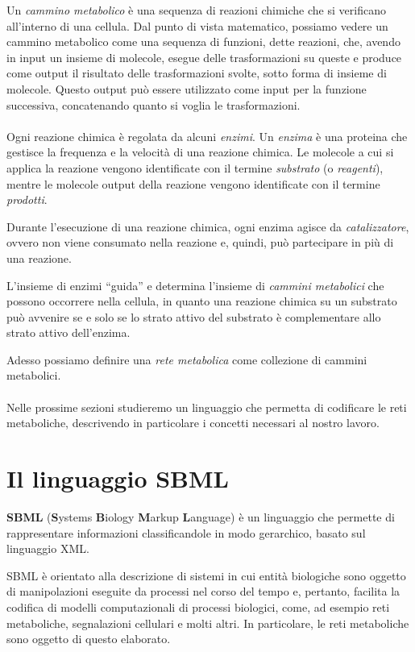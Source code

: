Un \emph{cammino metabolico} \`e una sequenza di reazioni chimiche che
si verificano all'interno di una cellula. Dal punto di vista
matematico, possiamo vedere un cammino metabolico come una sequenza di
funzioni, dette reazioni, che, avendo in input un insieme di molecole,
esegue delle trasformazioni su queste e produce come output il
risultato delle trasformazioni svolte, sotto forma di insieme di
molecole. Questo output pu\`o essere utilizzato come input per la
funzione successiva, concatenando quanto si voglia le trasformazioni.
\\\\
Ogni reazione chimica \`e regolata da alcuni \emph{enzimi}. Un
\emph{enzima} \`e una proteina che gestisce la frequenza e la
velocit\`a di una reazione chimica. Le molecole a cui si applica la
reazione vengono identificate con il termine \emph{substrato} (o
\emph{reagenti}), mentre le molecole output della reazione vengono
identificate con il termine \emph{prodotti}.

Durante l'esecuzione di una reazione chimica, ogni enzima
agisce da \emph{catalizzatore}, ovvero non viene consumato nella reazione
e, quindi, pu\`o partecipare in pi\`u di una reazione.

L'insieme di enzimi ``guida'' e determina l'insieme di \emph{cammini
  metabolici} che possono occorrere nella cellula, in quanto una
reazione chimica su un substrato pu\`o avvenire se e solo se lo strato
attivo del substrato \`e complementare allo strato attivo dell'enzima.

Adesso possiamo definire una \emph{rete metabolica} come collezione di
cammini metabolici.
\\\\
Nelle prossime sezioni studieremo un linguaggio che permetta di
codificare le reti metaboliche, descrivendo in particolare i concetti
necessari al nostro lavoro.

\section{Il linguaggio SBML}
\textbf{SBML} (\textbf{S}ystems \textbf{B}iology \textbf{M}arkup
\textbf{L}anguage) \`e un linguaggio che permette di rappresentare
informazioni classificandole in modo gerarchico, basato sul linguaggio
XML.

SBML \`e orientato alla descrizione di sistemi in cui entit\`a
biologiche sono oggetto di manipolazioni eseguite da processi nel
corso del tempo e, pertanto, facilita la codifica di modelli
computazionali di processi biologici, come, ad esempio reti
metaboliche, segnalazioni cellulari e molti altri. In particolare, le
reti metaboliche sono oggetto di questo elaborato.

